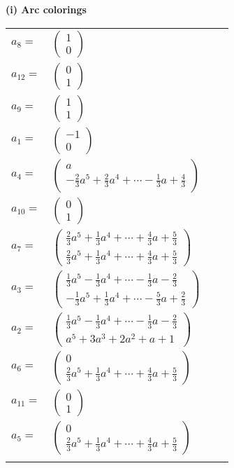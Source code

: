 \documentclass[1p]{elsarticle_modified}
\theoremstyle{definition}
\begin{document}
\flushleft \textbf{(i) Arc colorings}\\
\begin{tabular}{m{7pt} m{180pt} m{7pt} m{180pt} }
\flushright $a_{8}=$&$\begin{pmatrix}1\\0\end{pmatrix}$ \\
\flushright $a_{12}=$&$\begin{pmatrix}0\\1\end{pmatrix}$ \\
\flushright $a_{9}=$&$\begin{pmatrix}1\\1\end{pmatrix}$ \\
\flushright $a_{1}=$&$\begin{pmatrix}-1\\0\end{pmatrix}$ \\
\flushright $a_{4}=$&$\begin{pmatrix}a\\-\frac{2}{3} a^5+\frac{2}{3} a^4+\cdots-\frac{1}{3} a+\frac{4}{3}\end{pmatrix}$ \\
\flushright $a_{10}=$&$\begin{pmatrix}0\\1\end{pmatrix}$ \\
\flushright $a_{7}=$&$\begin{pmatrix}\frac{2}{3} a^5+\frac{1}{3} a^4+\cdots+\frac{4}{3} a+\frac{5}{3}\\\frac{2}{3} a^5+\frac{1}{3} a^4+\cdots+\frac{4}{3} a+\frac{5}{3}\end{pmatrix}$ \\
\flushright $a_{3}=$&$\begin{pmatrix}\frac{1}{3} a^5-\frac{1}{3} a^4+\cdots-\frac{1}{3} a-\frac{2}{3}\\-\frac{1}{3} a^5+\frac{1}{3} a^4+\cdots-\frac{5}{3} a+\frac{2}{3}\end{pmatrix}$ \\
\flushright $a_{2}=$&$\begin{pmatrix}\frac{1}{3} a^5-\frac{1}{3} a^4+\cdots-\frac{1}{3} a-\frac{2}{3}\\a^5+3 a^3+2 a^2+a+1\end{pmatrix}$ \\
\flushright $a_{6}=$&$\begin{pmatrix}0\\\frac{2}{3} a^5+\frac{1}{3} a^4+\cdots+\frac{4}{3} a+\frac{5}{3}\end{pmatrix}$ \\
\flushright $a_{11}=$&$\begin{pmatrix}0\\1\end{pmatrix}$ \\
\flushright $a_{5}=$&$\begin{pmatrix}0\\\frac{2}{3} a^5+\frac{1}{3} a^4+\cdots+\frac{4}{3} a+\frac{5}{3}\end{pmatrix}$\\&\end{tabular}
\end{document}
